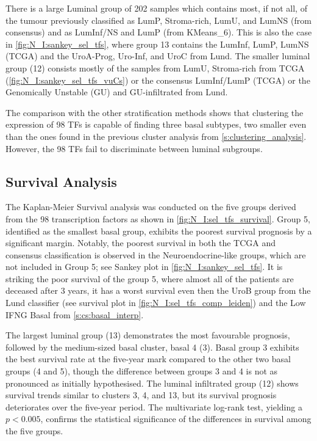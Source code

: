 There is a large Luminal group of 202 samples which contains most, if not all, of the tumour previously classified as LumP, Stroma-rich, LumU, and LumNS (from consensus) and as LumInf/NS and LumP (from KMeans\_6). This is also the case in \cref{fig:N_I:sankey_sel_tfs}, where group 13 contains the LumInf, LumP, LumNS (TCGA) and the UroA-Prog, Uro-Inf, and UroC from Lund. The smaller luminal group (12) consists mostly of the samples from LumU, Stroma-rich from TCGA (\cref{fig:N_I:sankey_sel_tfs_vuCs}) or the consensus LumInf/LumP (TCGA) or the Genomically Unstable (GU) and GU-infiltrated from Lund.

The comparison with the other stratification methods shows that clustering the expression of 98 TFs is capable of finding three basal subtypes, two smaller even than the ones found in the previous cluster analysis from \cref{s:clustering_analysis}. However, the 98 TFs fail to discriminate between luminal subgroups.

\subsection{Survival Analysis}

The Kaplan-Meier Survival analysis was conducted on the five groups derived from the 98 transcription factors as shown in \cref{fig:N_I:sel_tfs_survival}. Group 5, identified as the smallest basal group, exhibits the poorest survival prognosis by a significant margin. Notably, the poorest survival in both the TCGA and consensus classification is observed in the Neuroendocrine-like groups, which are not included in Group 5; see Sankey plot in \cref{fig:N_I:sankey_sel_tfs}. It is striking the poor survival of the group 5, where almost all of the patients are deceased after 3 years, it has a worst survival even then the UroB group from the Lund classifier (see survival plot in \cref{fig:N_I:sel_tfs_comp_leiden}) and the Low IFNG Basal from \cref{s:cs:basal_interp}.

The largest luminal group (13) demonstrates the most favourable prognosis, followed by the medium-sized basal cluster, basal 4 (3). Basal group 3 exhibits the best survival rate at the five-year mark compared to the other two basal groups (4 and 5), though the difference between groups 3 and 4 is not as pronounced as initially hypothesised. The luminal infiltrated group (12) shows survival trends similar to clusters 3, 4, and 13, but its survival prognosis deteriorates over the five-year period. The multivariate log-rank test, yielding a $p<0.005$, confirms the statistical significance of the differences in survival among the five groups.


